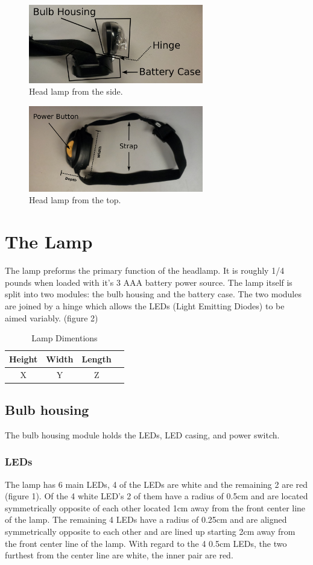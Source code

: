 \documentclass[12pt]{article}
\begin{document}
\begin{figure}[h!]
\centering
\caption{Head lamp from the side.}
\includegraphics[width=3in]{headlamp_side}
\end{figure}

\begin{figure}[h!]
\centering
\caption{Head lamp from the top.}
\includegraphics[width=3in]{headlamp_top}
\end{figure}

\section{The Lamp}
The lamp preforms the primary function of the headlamp. It is roughly 1/4 pounds when loaded with
it's 3 AAA battery power source. The lamp itself is split into two modules: the bulb housing and the
battery case. The two modules are joined by a hinge which allows the LEDs (Light Emitting
Diodes) to be aimed variably. (figure 2)

\begin{table}
\begin{tabular}{ | c | c | c | p{5cm} |}
    \hline
    Height & Width & Length \\ \hline
    X & Y & Z  \\ \hline
\end{tabular}
\caption{Lamp Dimentions}
\end{table}

\subsection{Bulb housing}
The bulb housing module holds the LEDs, LED casing, and power switch.

\subsubsection{LEDs}
The lamp has 6 main LEDs, 4 of the LEDs are white and the remaining 2 are red (figure 1). Of the 4
white LED's 2 of them have a radius of 0.5cm and are located symmetrically opposite of each other
located 1cm away from the front center line of the lamp.  The remaining 4 LEDs have a radius of
0.25cm and are aligned symmetrically opposite to each other and are lined up starting 2cm away from
the front center line of the lamp. With regard to the 4 0.5cm LEDs, the two furthest from the center
line are white, the inner pair are red.
\end{document}

